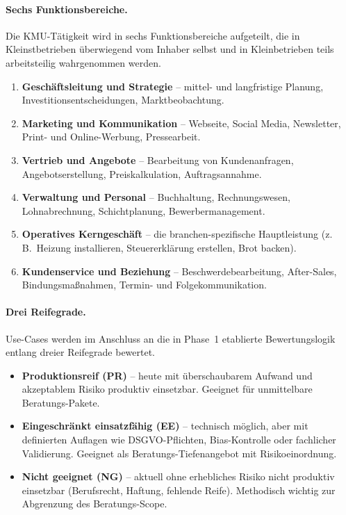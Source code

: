 \documentclass[a4paper,11pt]{article}
\begin{document}
\paragraph{Sechs Funktionsbereiche.}
Die KMU-Tätigkeit wird in sechs Funktionsbereiche aufgeteilt, die in
Kleinstbetrieben überwiegend vom Inhaber selbst und in Kleinbetrieben
teils arbeitsteilig wahrgenommen werden.

\begin{enumerate}
  \item \textbf{Geschäftsleitung und Strategie} -- mittel- und
        langfristige Planung, Investitionsentscheidungen,
        Marktbeobachtung.
  \item \textbf{Marketing und Kommunikation} -- Webseite, Social Media,
        Newsletter, Print- und Online-Werbung, Pressearbeit.
  \item \textbf{Vertrieb und Angebote} -- Bearbeitung von
        Kundenanfragen, Angebotserstellung, Preiskalkulation,
        Auftragsannahme.
  \item \textbf{Verwaltung und Personal} -- Buchhaltung, Rechnungswesen,
        Lohnabrechnung, Schichtplanung, Bewerbermanagement.
  \item \textbf{Operatives Kerngeschäft} -- die branchen-spezifische
        Hauptleistung (z.\,B.\ Heizung installieren, Steuererklärung
        erstellen, Brot backen).
  \item \textbf{Kundenservice und Beziehung} -- Beschwerdebearbeitung,
        After-Sales, Bindungsmaßnahmen, Termin- und Folgekommunikation.
\end{enumerate}

\paragraph{Drei Reifegrade.}
Use-Cases werden im Anschluss an die in Phase~1 etablierte
Bewertungslogik entlang dreier Reifegrade bewertet.

\begin{itemize}
  \item \textbf{Produktionsreif (PR)} -- heute mit überschaubarem
        Aufwand und akzeptablem Risiko produktiv einsetzbar. Geeignet
        für unmittelbare Beratungs-Pakete.
  \item \textbf{Eingeschränkt einsatzfähig (EE)} -- technisch möglich,
        aber mit definierten Auflagen wie DSGVO-Pflichten,
        Bias-Kontrolle oder fachlicher Validierung. Geeignet als
        Beratungs-Tiefen\-angebot mit Risikoeinordnung.
  \item \textbf{Nicht geeignet (NG)} -- aktuell ohne erhebliches Risiko
        nicht produktiv einsetzbar (Berufsrecht, Haftung, fehlende
        Reife). Methodisch wichtig zur Abgrenzung des Beratungs-Scope.
\end{itemize}
\end{document}

